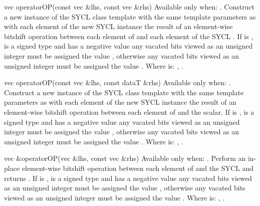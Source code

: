   \addRow
  {vec operatorOP(const vec \&lhs, const vec \&rhs)}
  {
    Available only when: .
    \newline
    Construct a new instance of the SYCL  class template with the same template parameters as   with each element of the new SYCL  instance the result of an element-wise  bitshift operation between each element of   and each element of the  SYCL . If  is \codeinline{>>},  is a signed type and   has a negative value any vacated bits viewed as an unsigned integer must be assigned the value , otherwise any vacated bits viewed as an unsigned integer must be assigned the value .
    \newline \newline
    Where  is: \codeinline{<<}, \codeinline{>>}.
  }

   \addRow
  {vec operatorOP(const vec \&lhs, const dataT \&rhs)}
  {
    Available only when: .
    \newline
    Construct a new instance of the SYCL  class template with the same template parameters as   with each element of the new SYCL  instance the result of an element-wise  bitshift operation between each element of   and the  scalar. If  is \codeinline{>>},  is a signed type and   has a negative value any vacated bits viewed as an unsigned integer must be assigned the value , otherwise any vacated bits viewed as an unsigned integer must be assigned the value .
    \newline \newline
    Where  is: \codeinline{<<}, \codeinline{>>}.
  }
  
  \addRow
  {vec \&operatorOP(vec \&lhs, const vec \&rhs)}
  {
    Available only when: .
    \newline
    Perform an in-place element-wise  bitshift operation between each element of   and the  SYCL  and returns  . If  is \codeinline{>>\=},  is a signed type and   has a negative value any vacated bits viewed as an unsigned integer must be assigned the value , otherwise any vacated bits viewed as an unsigned integer must be assigned the value .
    \newline \newline
    Where  is: \codeinline{<<\=}, \codeinline{>>\=}.
  }

